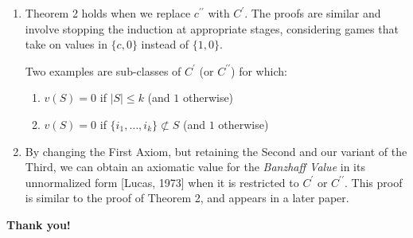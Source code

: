 \documentclass[
paper=128mm:96mm, %
fontsize=11pt, %
pagesize, %
parskip=half-, %
]{scrartcl} %
\theoremstyle{mythmstyle} %
\begin{document}
\begin{enumerate}
\item Theorem 2 holds when we replace $c^{\prime\prime}$ with $C^{\prime}$. The proofs are similar and involve stopping the induction at appropriate stages, considering games that take on values in $\{c, 0\}$ instead of $\{1, 0\}$.

Two examples are sub-classes of $C^{\prime}$ (or $C^{\prime\prime}$) for which:
	\begin{enumerate}
    \item $v(S) = 0$ if $|S| \le k$ (and $1$ otherwise)
    \item $v(S) = 0$ if $\{i_{1}, \dots, i_{k}\} \not\subset S$ (and $1$ otherwise)
	\end{enumerate}

\item By changing the First Axiom, but retaining the Second and our variant of the Third, we can obtain an axiomatic value for the \emph{Banzhaff Value} in its unnormalized form [Lucas, 1973] when it is restricted to $C^{\prime}$ or $C^{\prime\prime}$. This proof is similar to the proof of Theorem 2, and appears in a later paper.

\end{enumerate}

\clearpage

\thispagestyle{empty} %




\clearpage


\thispagestyle{empty} %

\begin{flushright}
\vspace{0.6cm}
\color{white}\sffamily
{\bfseries\LARGE Thank you!\par} %
\vfill
\end{flushright}

\end{document}
